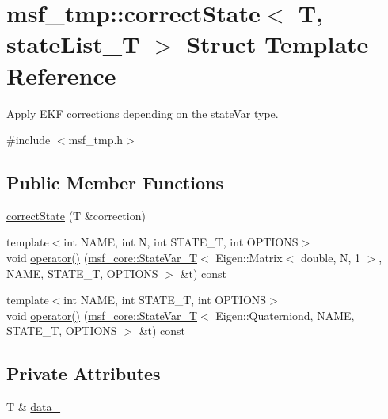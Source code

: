 \hypertarget{structmsf__tmp_1_1correctState}{\section{msf\-\_\-tmp\-:\-:correct\-State$<$ T, state\-List\-\_\-\-T $>$ Struct Template Reference}
\label{structmsf__tmp_1_1correctState}
}


Apply E\-K\-F corrections depending on the state\-Var type.  




{\ttfamily \#include $<$msf\-\_\-tmp.\-h$>$}

\subsection*{Public Member Functions}
\begin{DoxyCompactItemize}
\item 
\hyperlink{structmsf__tmp_1_1correctState_a7e1bbad053e3cbfedeaf3badf598e12b}{correct\-State} (T \&correction)
\item 
{\footnotesize template$<$int N\-A\-M\-E, int N, int S\-T\-A\-T\-E\-\_\-\-T, int O\-P\-T\-I\-O\-N\-S$>$ }\\void \hyperlink{structmsf__tmp_1_1correctState_ab4832ee8c894ea3360076131c840abc2}{operator()} (\hyperlink{structmsf__core_1_1StateVar__T}{msf\-\_\-core\-::\-State\-Var\-\_\-\-T}$<$ Eigen\-::\-Matrix$<$ double, N, 1 $>$, N\-A\-M\-E, S\-T\-A\-T\-E\-\_\-\-T, O\-P\-T\-I\-O\-N\-S $>$ \&t) const 
\item 
{\footnotesize template$<$int N\-A\-M\-E, int S\-T\-A\-T\-E\-\_\-\-T, int O\-P\-T\-I\-O\-N\-S$>$ }\\void \hyperlink{structmsf__tmp_1_1correctState_a0c74a4126c2ecaa2a8843fe47bacecc0}{operator()} (\hyperlink{structmsf__core_1_1StateVar__T}{msf\-\_\-core\-::\-State\-Var\-\_\-\-T}$<$ Eigen\-::\-Quaterniond, N\-A\-M\-E, S\-T\-A\-T\-E\-\_\-\-T, O\-P\-T\-I\-O\-N\-S $>$ \&t) const 
\end{DoxyCompactItemize}
\subsection*{Private Attributes}
\begin{DoxyCompactItemize}
\item 
T \& \hyperlink{structmsf__tmp_1_1correctState_a683999c91aa093782b7356bd9436a810}{data\-\_\-}
\end{DoxyCompactItemize}


